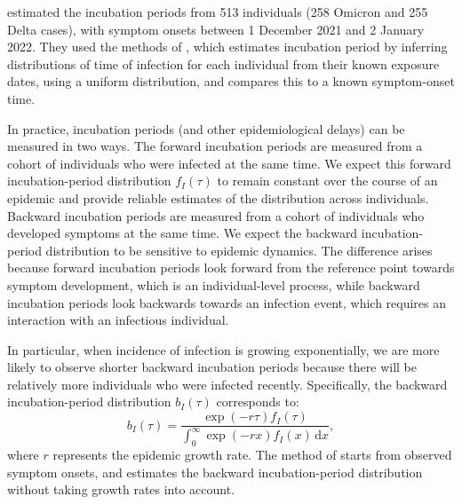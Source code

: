 \documentclass[12pt]{article}
\newcommand{\dd}[1]{\ensuremath{\, \mathrm{d}#1}}
\newcommand{\dx}{\dd{x}}
\begin{document}
\cite{backer2021omicron} estimated the incubation periods from 513 individuals (258 Omicron and 255 Delta cases), with symptom onsets between 1 December 2021 and 2 January 2022.
They used the methods of \cite{backer2020incubation}, which estimates incubation period by inferring distributions of time of infection for each individual from their known exposure dates, using a uniform distribution, and compares this to a known symptom-onset time.

In practice, incubation periods (and other epidemiological delays) can be measured in two ways.
The forward incubation periods are measured from a cohort of individuals who were infected at the same time. 
We expect this forward incubation-period distribution $f_I(\tau)$ to remain constant over the course of an epidemic and provide reliable estimates of the distribution across individuals. 
Backward incubation periods are measured from a cohort of individuals who developed symptoms at the same time. 
We expect the backward incubation-period distribution to be sensitive to epidemic dynamics.
The difference arises because forward incubation periods look forward from the reference point towards symptom development, which is an individual-level process, while backward incubation periods look backwards towards an infection event, which requires an interaction with an infectious individual.

In particular, when incidence of infection is growing exponentially, we are more likely to observe shorter backward incubation periods because there will be relatively more individuals who were infected recently.
Specifically, the backward incubation-period distribution $b_I(\tau)$ corresponds to:
\begin{equation}
b_I(\tau) =\frac{ \exp(-r\tau) f_I(\tau)}{\int_0^\infty \exp(-r x) f_I(x)  \dx},
\label{eq:backward}
\end{equation}
where $r$ represents the epidemic growth rate.
The method of \cite{backer2020incubation} starts from observed symptom onsets, and estimates the backward incubation-period distribution without taking growth rates into account.
\end{document}
